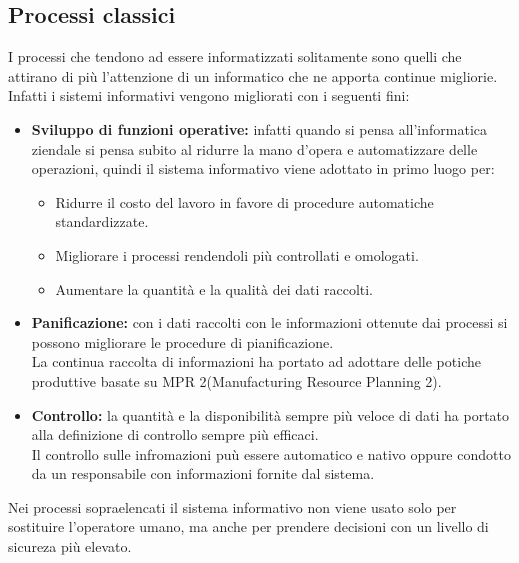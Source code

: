 \documentclass{book}
\begin{document}
    \subsection{Processi classici}
    I processi che tendono ad essere informatizzati solitamente sono quelli che attirano di più l'attenzione di un informatico che ne apporta continue migliorie.\\
    Infatti i sistemi informativi vengono migliorati con i seguenti fini:
    \begin{itemize}
        \item \textbf{Sviluppo di funzioni operative:} infatti quando si pensa all'informatica ziendale si pensa subito al ridurre la mano d'opera e automatizzare delle operazioni, quindi il sistema informativo viene adottato in primo luogo per:
        \begin{itemize}
            \item Ridurre il costo del lavoro in favore di procedure automatiche standardizzate.
            \item Migliorare i processi rendendoli più controllati e omologati.
            \item Aumentare la quantità e la qualità dei dati raccolti.
        \end{itemize}
        \item \textbf{Panificazione:} con i dati raccolti con le informazioni ottenute dai processi si possono migliorare le procedure di pianificazione.\\
            La continua raccolta di informazioni ha portato ad adottare delle potiche produttive basate su MPR 2(Manufacturing Resource Planning 2).
        \item \textbf{Controllo:} la quantità e la disponibilità sempre più veloce di dati ha portato alla definizione di controllo sempre più efficaci.\\
            Il controllo sulle infromazioni puù essere automatico e nativo oppure condotto da un responsabile con informazioni fornite dal sistema.
    \end{itemize}
    Nei processi sopraelencati il sistema informativo non viene usato solo per sostituire l'operatore umano, ma anche per prendere decisioni con un livello di sicureza più elevato.
\end{document}
